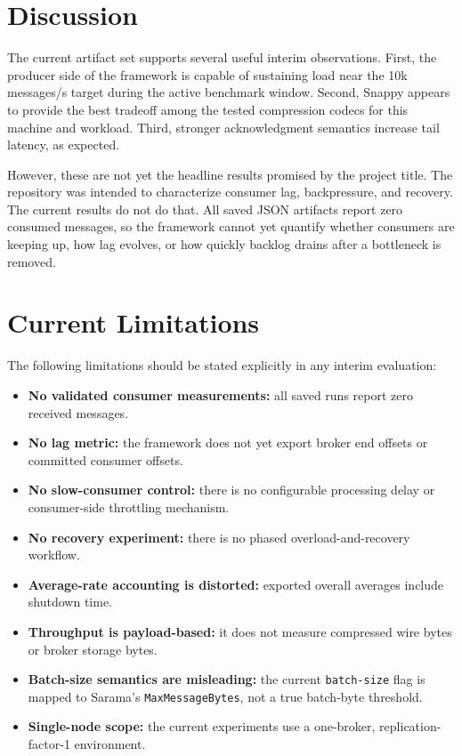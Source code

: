 \documentclass[conference]{IEEEtran}
\begin{document}
\section{Discussion}
The current artifact set supports several useful interim observations. First, the producer side of the framework is capable of sustaining load near the 10k messages/s target during the active benchmark window. Second, Snappy appears to provide the best tradeoff among the tested compression codecs for this machine and workload. Third, stronger acknowledgment semantics increase tail latency, as expected.

However, these are not yet the headline results promised by the project title. The repository was intended to characterize consumer lag, backpressure, and recovery. The current results do not do that. All saved JSON artifacts report zero consumed messages, so the framework cannot yet quantify whether consumers are keeping up, how lag evolves, or how quickly backlog drains after a bottleneck is removed.

\section{Current Limitations}
The following limitations should be stated explicitly in any interim evaluation:

\begin{itemize}
\item \textbf{No validated consumer measurements:} all saved runs report zero received messages.
\item \textbf{No lag metric:} the framework does not yet export broker end offsets or committed consumer offsets.
\item \textbf{No slow-consumer control:} there is no configurable processing delay or consumer-side throttling mechanism.
\item \textbf{No recovery experiment:} there is no phased overload-and-recovery workflow.
\item \textbf{Average-rate accounting is distorted:} exported overall averages include shutdown time.
\item \textbf{Throughput is payload-based:} it does not measure compressed wire bytes or broker storage bytes.
\item \textbf{Batch-size semantics are misleading:} the current \texttt{batch-size} flag is mapped to Sarama's \texttt{MaxMessageBytes}, not a true batch-byte threshold.
\item \textbf{Single-node scope:} the current experiments use a one-broker, replication-factor-1 environment.
\end{itemize}
\end{document}
